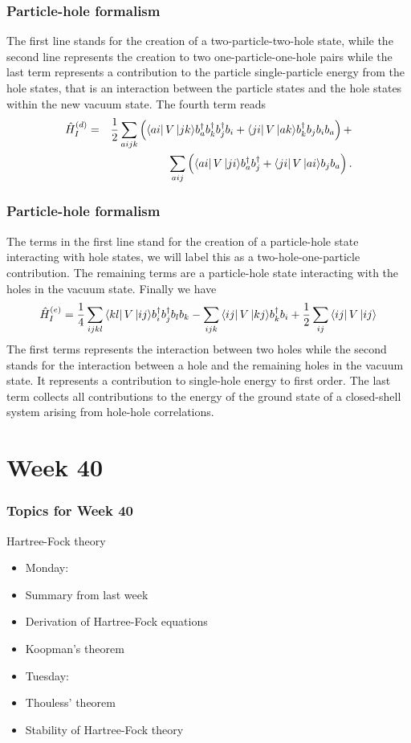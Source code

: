 \frame
{
  \frametitle{Particle-hole formalism}
\begin{small}
{\scriptsize
The first line stands for the creation of a two-particle-two-hole state, while the second line represents
the creation to two one-particle-one-hole pairs
while the last term represents a contribution to the particle single-particle energy
from the hole states, that is an interaction between the particle states and the hole states
within the new vacuum  state.
The fourth term reads
\begin{eqnarray}
	 \hat{H}_I^{(d)}& = &\frac{1}{2} 
	 	\sum_{aijk}\left(\bra{ai}V\,|{jk}\rangle b_a^\dagger b_k^\dagger b_j^\dagger b_i+
\bra{ji}V\,|{ak}\rangle b_k^\dagger b_j b_i b_a\right)+\nonumber \\
&&\sum_{aij}\left(\bra{ai}V\,|{ji}\rangle b_a^\dagger b_j^\dagger+\bra{ji}V\,|{ai}\rangle b_j b_a \right). \nonumber
\end{eqnarray}
}
\end{small}
}


\frame
{
  \frametitle{Particle-hole formalism}
\begin{small}
{\scriptsize
The terms in the first line  stand for the creation of a particle-hole state 
interacting with hole states, we will label this as a two-hole-one-particle contribution. 
The remaining terms are a particle-hole state interacting with the holes in the vacuum state. 
Finally we have 
\[
	\hat{H}_I^{(e)} = \frac{1}{4}
		 \sum_{ijkl}
		 \bra{kl}V\,|{ij}\rangle b_i^\dagger b_j^\dagger b_l b_k
	        -\sum_{ijk}\bra{ij}V\,|{kj}\rangle b_k^\dagger b_i
	        +\frac{1}{2}\sum_{ij}\bra{ij}V\,|{ij}\rangle
\]
The first terms represents the 
interaction between two holes while the second stands for the interaction between a hole and the remaining holes in the vacuum state.
It represents a contribution to single-hole energy  to first order.
The last term collects all contributions to the energy of the ground state of a closed-shell system arising
from hole-hole correlations.
}
\end{small}
}


\section[Week 40]{Week 40}
\frame
{
  \frametitle{Topics for Week 40}
  \begin{block}{Hartree-Fock theory}
\begin{itemize}
\item Monday:
\item Summary from last week
\item Derivation of Hartree-Fock equations
\item Koopman's theorem
\item Tuesday:
\item Thouless' theorem
\item Stability of Hartree-Fock theory
\end{itemize}

  \end{block}
} 



